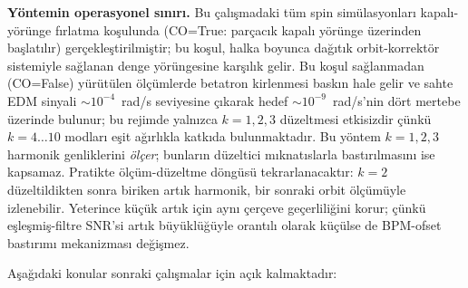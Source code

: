 \documentclass[preprint,12pt]{elsarticle}
\begin{document}
\textbf{Yöntemin operasyonel sınırı.}
Bu çalışmadaki tüm spin simülasyonları kapalı-yörünge fırlatma koşulunda
(CO=True: parçacık kapalı yörünge üzerinden başlatılır) gerçekleştirilmiştir;
bu koşul, halka boyunca dağıtık orbit-korrektör sistemiyle sağlanan denge yörüngesine
karşılık gelir. Bu koşul sağlanmadan (CO=False) yürütülen ölçümlerde betatron
kirlenmesi baskın hale gelir ve sahte EDM sinyali $\sim\!10^{-4}$~rad/s seviyesine
çıkarak hedef $\sim\!10^{-9}$~rad/s'nin dört mertebe üzerinde bulunur;
bu rejimde yalnızca $k=1,2,3$ düzeltmesi etkisizdir çünkü $k=4\ldots10$ modları
eşit ağırlıkla katkıda bulunmaktadır.
Bu yöntem $k=1,2,3$ harmonik genliklerini \emph{ölçer}; bunların düzeltici
mıknatıslarla bastırılmasını ise kapsamaz. Pratikte ölçüm-düzeltme döngüsü
tekrarlanacaktır: $k=2$ düzeltildikten sonra biriken artık harmonik, bir
sonraki orbit ölçümüyle izlenebilir. Yeterince küçük artık için aynı
çerçeve geçerliliğini korur; çünkü eşleşmiş-filtre SNR'si artık büyüklüğüyle
orantılı olarak küçülse de BPM-ofset bastırımı mekanizması değişmez.

Aşağıdaki konular sonraki çalışmalar için açık kalmaktadır:
\end{document}
